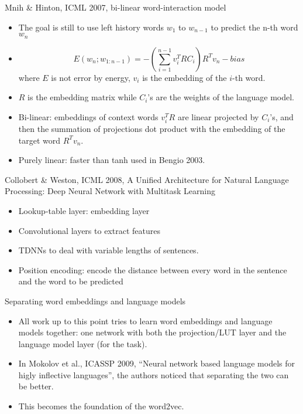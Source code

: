 \documentclass[11pt,handout]{beamer}
\begin{document}
\begin{frame}{Mnih \& Hinton, ICML 2007, bi-linear word-interaction model}
\begin{itemize}[<+->]
  \item The goal is still to use left history words $w_1$ to $w_{n-1}$ to predict the n-th word $w_n$
  \item $$ E(w_n ; w_{1:n-1}) = - \left ( \sum_{i=1}^{n-1} v_i^T R C_i  \right ) R^T v_n - bias $$ 
  where $E$ is not error by energy, $v_i$ is the embedding of the $i$-th word. 
  \item $R$ is the embedding matrix while $C_i$'s are the weights of the language model. 
  \item Bi-linear: embeddings of context words $v_i^T R$ are linear projected by $C_i$'s, and then the summation of projections dot product with the embedding of the target word $R^Tv_n$. 
  \item Purely linear: faster than tanh used in Bengio 2003. 
\end{itemize}
\end{frame}

\begin{frame}{Collobert \& Weston, ICML 2008, A Unified Architecture for Natural Language Processing: Deep Neural Network with Multitask Learning}
\begin{itemize}[<+->]
  \item Lookup-table layer: embedding layer 
  \item Convolutional layers to extract features
  \item TDNNs to deal with variable lengths of sentences. 
  \item Position encoding: encode the distance between every word in the sentence and the word to be predicted 
\end{itemize}
\end{frame}

\begin{frame}{Separating word embeddings and language models}
\begin{itemize}[<+->]
   \item All work up to this point tries to learn word embeddings and language models together: one network with both the projection/LUT layer  and the language model layer (for the task). 
   \item In  Mokolov et al., ICASSP 2009, ``Neural network based language models for higly inflective languages'', the authors noticed that separating the two can be better. 
   \item This becomes the foundation of the word2vec. 
\end{itemize}
\end{frame}
\end{document}
